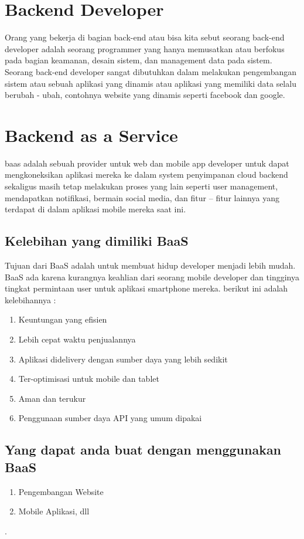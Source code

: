 \section{Backend Developer}
	Orang yang bekerja di bagian back-end atau bisa kita sebut seorang back-end developer adalah seorang programmer yang hanya
memusatkan atau berfokus pada bagian keamanan, desain sistem, dan management data pada sistem. Seorang back-end developer
sangat dibutuhkan dalam melakukan pengembangan sistem atau sebuah aplikasi yang dinamis atau aplikasi yang memiliki data selalu
berubah - ubah, contohnya website yang dinamis seperti facebook dan google.

\section{Backend as a Service}
	baas adalah sebuah provider untuk web dan mobile app developer untuk dapat mengkoneksikan 
aplikasi mereka ke dalam system penyimpanan cloud backend sekaligus masih tetap melakukan proses yang lain seperti user management, 
mendapatkan notifikasi, bermain social media, dan fitur – fitur lainnya yang terdapat di dalam aplikasi mobile mereka saat ini.

\subsection{Kelebihan yang dimiliki BaaS}
	Tujuan dari BaaS adalah untuk membuat hidup developer menjadi 
lebih mudah. BaaS ada karena kurangnya keahlian dari seorang 
mobile developer dan tingginya tingkat permintaan user untuk 
aplikasi smartphone mereka. berikut ini adalah kelebihannya :

\begin{enumerate}
\item Keuntungan yang efisien
\item Lebih cepat waktu penjualannya
\item Aplikasi didelivery dengan sumber daya yang lebih sedikit
\item Ter-optimisasi untuk mobile dan tablet
\item Aman dan terukur
\item Penggunaan sumber daya API yang umum dipakai
\end{enumerate}

\subsection {Yang dapat anda buat dengan menggunakan BaaS}
\begin{enumerate}
\item Pengembangan Website
\item Mobile Aplikasi, dll
\end{enumerate}
\cite{lane2015overview}.

